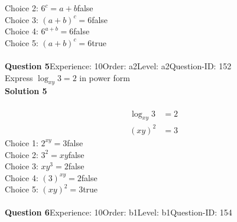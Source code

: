 \documentclass{article}
\begin{document}
Choice 2: \hspace{20pt}$6^c=a+b$\hspace{20pt}false\\
Choice 3: \hspace{20pt}$(a+b)^c=6$\hspace{20pt}false\\
Choice 4: \hspace{20pt}$6^{a+b}=6$\hspace{20pt}false\\
Choice 5: \hspace{20pt}$(a+b)^c=6$\hspace{20pt}true\\
\\[4pt]
\noindent\textbf{Question 5}\hspace{20pt}Experience: 10\hspace{20pt}Order: a2\hspace{20pt}Level: a2\hspace{20pt}Question-ID: 152\\[2pt]
Express $\log_{xy}3=2$ in power form\\[4pt]
\noindent\textbf{Solution 5}\\[2pt]
\\[-35pt]\begin{align*}
\log_{xy}3&=2\\[2pt]
(xy)^2&=3
\end{align*}
Choice 1: \hspace{20pt}$2^{xy}=3$\hspace{20pt}false\\
Choice 2: \hspace{20pt}$3^2=xy$\hspace{20pt}false\\
Choice 3: \hspace{20pt}$xy^{3}=2$\hspace{20pt}false\\
Choice 4: \hspace{20pt}$(3)^{xy}=2$\hspace{20pt}false\\
Choice 5: \hspace{20pt}$(xy)^2=3$\hspace{20pt}true\\
\\[4pt]
\noindent\textbf{Question 6}\hspace{20pt}Experience: 10\hspace{20pt}Order: b1\hspace{20pt}Level: b1\hspace{20pt}Question-ID: 154\\[2pt]
\end{document}

